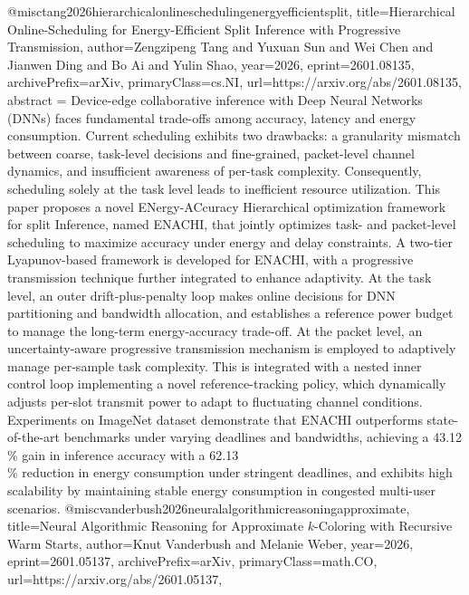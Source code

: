 {}@misc{tang2026hierarchicalonlineschedulingenergyefficientsplit,
      title={Hierarchical Online-Scheduling for Energy-Efficient Split Inference with Progressive Transmission}, 
      author={Zengzipeng Tang and Yuxuan Sun and Wei Chen and Jianwen Ding and Bo Ai and Yulin Shao},
      year={2026},
      eprint={2601.08135},
      archivePrefix={arXiv},
      primaryClass={cs.NI},
      url={https://arxiv.org/abs/2601.08135},
      abstract = {Device-edge collaborative inference with Deep Neural Networks (DNNs) faces fundamental trade-offs among accuracy, latency and energy consumption. Current scheduling exhibits two drawbacks: a granularity mismatch between coarse, task-level decisions and fine-grained, packet-level channel dynamics, and insufficient awareness of per-task complexity. Consequently, scheduling solely at the task level leads to inefficient resource utilization. This paper proposes a novel ENergy-ACcuracy Hierarchical optimization framework for split Inference, named ENACHI, that jointly optimizes task- and packet-level scheduling to maximize accuracy under energy and delay constraints. A two-tier Lyapunov-based framework is developed for ENACHI, with a progressive transmission technique further integrated to enhance adaptivity. At the task level, an outer drift-plus-penalty loop makes online decisions for DNN partitioning and bandwidth allocation, and establishes a reference power budget to manage the long-term energy-accuracy trade-off. At the packet level, an uncertainty-aware progressive transmission mechanism is employed to adaptively manage per-sample task complexity. This is integrated with a nested inner control loop implementing a novel reference-tracking policy, which dynamically adjusts per-slot transmit power to adapt to fluctuating channel conditions. Experiments on ImageNet dataset demonstrate that ENACHI outperforms state-of-the-art benchmarks under varying deadlines and bandwidths, achieving a 43.12\\\% gain in inference accuracy with a 62.13\\\% reduction in energy consumption under stringent deadlines, and exhibits high scalability by maintaining stable energy consumption in congested multi-user scenarios.}
}@misc{vanderbush2026neuralalgorithmicreasoningapproximate,
      title={Neural Algorithmic Reasoning for Approximate $k$-Coloring with Recursive Warm Starts}, 
      author={Knut Vanderbush and Melanie Weber},
      year={2026},
      eprint={2601.05137},
      archivePrefix={arXiv},
      primaryClass={math.CO},
      url={https://arxiv.org/abs/2601.05137},
}

